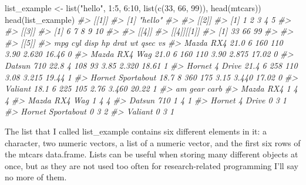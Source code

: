 \documentclass[
]{krantz}
\makeatletter
\newenvironment{Shaded}{\begin{snugshade}}{\end{snugshade}}
\newcommand{\CommentTok}[1]{\textcolor[rgb]{0.37,0.37,0.37}{\textit{#1}}}
\newcommand{\DecValTok}[1]{\textcolor[rgb]{0.06,0.06,0.06}{#1}}
\newcommand{\FunctionTok}[1]{\textcolor[rgb]{0,0,0}{#1}}
\newcommand{\NormalTok}[1]{#1}
\newcommand{\OtherTok}[1]{\textcolor[rgb]{0.37,0.37,0.37}{#1}}
\newcommand{\SpecialCharTok}[1]{\textcolor[rgb]{0,0,0}{#1}}
\newcommand{\StringTok}[1]{\textcolor[rgb]{0.5,0.5,0.5}{#1}}
\newenvironment{kframe}{%
\medskip{}
\setlength{\fboxsep}{.8em}
 \def\at@end@of@kframe{}%
 \ifinner\ifhmode%
  \def\at@end@of@kframe{\end{minipage}}%
  \begin{minipage}{\columnwidth}%
 \fi\fi%
 \def\FrameCommand##1{\hskip\@totalleftmargin \hskip-\fboxsep
 \colorbox{shadecolor}{##1}\hskip-\fboxsep
     \hskip-\linewidth \hskip-\@totalleftmargin \hskip\columnwidth}%
 \MakeFramed {\advance\hsize-\width
   \@totalleftmargin\z@ \linewidth\hsize
   \@setminipage}}%
 {\par\unskip\endMakeFramed%
 \at@end@of@kframe}
\renewenvironment{Shaded}{\begin{kframe}}{\end{kframe}}
\makeatother
\begin{document}
\begin{Shaded}
\begin{Highlighting}[]
\NormalTok{list\_example }\OtherTok{\textless{}{-}} \FunctionTok{list}\NormalTok{(}\StringTok{"hello"}\NormalTok{, }\DecValTok{1}\SpecialCharTok{:}\DecValTok{5}\NormalTok{, }\DecValTok{6}\SpecialCharTok{:}\DecValTok{10}\NormalTok{, }\FunctionTok{list}\NormalTok{(}\FunctionTok{c}\NormalTok{(}\DecValTok{33}\NormalTok{, }\DecValTok{66}\NormalTok{, }\DecValTok{99}\NormalTok{)), }\FunctionTok{head}\NormalTok{(mtcars))}
\FunctionTok{head}\NormalTok{(list\_example)}
\CommentTok{\#\textgreater{} [[1]]}
\CommentTok{\#\textgreater{} [1] "hello"}
\CommentTok{\#\textgreater{} }
\CommentTok{\#\textgreater{} [[2]]}
\CommentTok{\#\textgreater{} [1] 1 2 3 4 5}
\CommentTok{\#\textgreater{} }
\CommentTok{\#\textgreater{} [[3]]}
\CommentTok{\#\textgreater{} [1]  6  7  8  9 10}
\CommentTok{\#\textgreater{} }
\CommentTok{\#\textgreater{} [[4]]}
\CommentTok{\#\textgreater{} [[4]][[1]]}
\CommentTok{\#\textgreater{} [1] 33 66 99}
\CommentTok{\#\textgreater{} }
\CommentTok{\#\textgreater{} }
\CommentTok{\#\textgreater{} [[5]]}
\CommentTok{\#\textgreater{}                    mpg cyl disp  hp drat    wt  qsec vs}
\CommentTok{\#\textgreater{} Mazda RX4         21.0   6  160 110 3.90 2.620 16.46  0}
\CommentTok{\#\textgreater{} Mazda RX4 Wag     21.0   6  160 110 3.90 2.875 17.02  0}
\CommentTok{\#\textgreater{} Datsun 710        22.8   4  108  93 3.85 2.320 18.61  1}
\CommentTok{\#\textgreater{} Hornet 4 Drive    21.4   6  258 110 3.08 3.215 19.44  1}
\CommentTok{\#\textgreater{} Hornet Sportabout 18.7   8  360 175 3.15 3.440 17.02  0}
\CommentTok{\#\textgreater{} Valiant           18.1   6  225 105 2.76 3.460 20.22  1}
\CommentTok{\#\textgreater{}                   am gear carb}
\CommentTok{\#\textgreater{} Mazda RX4          1    4    4}
\CommentTok{\#\textgreater{} Mazda RX4 Wag      1    4    4}
\CommentTok{\#\textgreater{} Datsun 710         1    4    1}
\CommentTok{\#\textgreater{} Hornet 4 Drive     0    3    1}
\CommentTok{\#\textgreater{} Hornet Sportabout  0    3    2}
\CommentTok{\#\textgreater{} Valiant            0    3    1}
\end{Highlighting}
\end{Shaded}

The list that I called list\_example contains six different elements in it: a character, two numeric vectors, a list of a numeric vector, and the first six rows of the mtcars data.frame. Lists can be useful when storing many different objects at once, but as they are not used too often for research-related programming I'll say no more of them.
\end{document}
